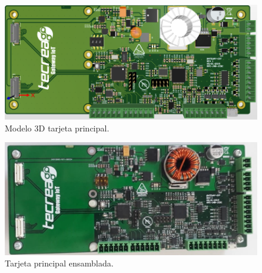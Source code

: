 \begin{figure}[H]
	\centering
	\includegraphics[scale=.45]{./Figures/mainboard3D.png}
	\caption{Modelo 3D tarjeta principal.}
	\label{fig:mainboard}
\end{figure}

\begin{figure}[H]
	\centering
	\includegraphics[scale=.45]{./Figures/mainboardSola.jpeg}
	\caption{Tarjeta principal ensamblada.}
	\label{fig:MainBoardCompleta}
\end{figure}


	




